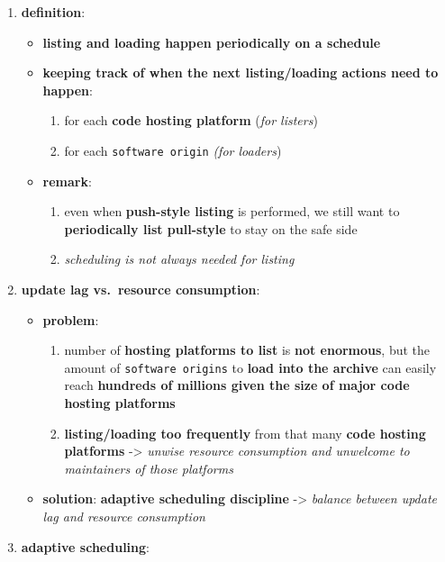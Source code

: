 \documentclass[11pt]{article}
\providecommand{\tightlist}{%
      \setlength{\itemsep}{0pt}\setlength{\parskip}{0pt}}
\begin{document}
\begin{enumerate}
\def\labelenumi{\arabic{enumi}.}
\tightlist
\item
  \textbf{definition}:

  \begin{itemize}
  \tightlist
  \item
    \textbf{listing and loading happen periodically on a schedule}
  \item
    \textbf{keeping track of when the next listing/loading actions need
    to happen}:

    \begin{enumerate}
    \def\labelenumii{\arabic{enumii}.}
    \tightlist
    \item
      for each \textbf{code hosting platform} (\emph{for listers})
    \item
      for each \texttt{software\ origin} \emph{(for loaders})
    \end{enumerate}
  \item
    \textbf{remark}:

    \begin{enumerate}
    \def\labelenumii{\arabic{enumii}.}
    \tightlist
    \item
      even when \textbf{push-style listing} is performed, we still want
      to \textbf{periodically list pull-style} to stay on the safe side
    \item
      \emph{scheduling is not always needed for listing}
    \end{enumerate}
  \end{itemize}
\item
  \textbf{update lag vs.~resource consumption}:

  \begin{itemize}
  \tightlist
  \item
    \textbf{problem}:

    \begin{enumerate}
    \def\labelenumii{\arabic{enumii}.}
    \tightlist
    \item
      number of \textbf{hosting platforms to list} is \textbf{not
      enormous}, but the amount of \texttt{software\ origins} to
      \textbf{load into the archive} can easily reach \textbf{hundreds
      of millions given the size of major code hosting platforms}
    \item
      \textbf{listing/loading too frequently} from that many
      \textbf{code hosting platforms} -\textgreater{} \emph{unwise
      resource consumption and unwelcome to maintainers of those
      platforms}
    \end{enumerate}
  \item
    \textbf{solution}: \textbf{adaptive scheduling discipline}
    -\textgreater{} \emph{balance between update lag and resource
    consumption}
  \end{itemize}
\item
  \textbf{adaptive scheduling}:


\end{enumerate}
\end{document}
